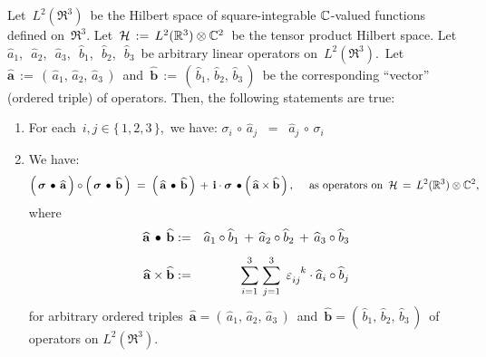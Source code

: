 \vskip 0.5cm
\begin{lemma}
\label{PauliMatricesSpinorProperties}
\mbox{}
\vskip 0.1cm
\noindent
Let
\,$L^{2}(\Re^{3})$\,
be the Hilbert space of square-integrable $\mathbb{C}$-valued functions defined on \,$\Re^{3}$.
\vskip 0.1cm
\noindent
Let
\,$\mathcal{H} \, := \, L^{2}(\mathbb{R}^{3}) \otimes \mathbb{C}^{2}$\,
be the tensor product Hilbert space.
\vskip 0.1cm
\noindent
Let
\,$\widehat{a}_{1}$,\,
\,$\widehat{a}_{2}$,\,
\,$\widehat{a}_{3}$,\,
\,$\widehat{b}_{1}$,\,
\,$\widehat{b}_{2}$,\,
\,$\widehat{b}_{3}$\,
be arbitrary {\color{red}linear} operators on \,$L^{2}(\Re^{3})$.\,
\vskip 0.1cm
\noindent
Let
\,$\widehat{\boldsymbol{a}} \, := \, \left(\,\widehat{a}_{1},\,\widehat{a}_{2},\,\widehat{a}_{3}\,\right)$\,
and
\,$\widehat{\boldsymbol{b}} \, := \, \left(\,\widehat{b}_{1},\,\widehat{b}_{2},\,\widehat{b}_{3}\,\right)$\,
be the corresponding ``vector'' (ordered triple) of operators.
\vskip 0.1cm
\noindent
Then, the following statements are true:
\begin{enumerate}
\item
    For each \,$i,j \in \{\,1,2,3\,\}$,\, we have:
    \;$
    \sigma_{i} \,\circ\, \widehat{a}_{j}
    \;\; = \;\;
        \widehat{a}_{j} \,\circ\, \sigma_{i}
    $\,
\item
    We have:
    \begin{equation*}
    \left(\,\boldsymbol{\sigma} \,\overset{{\color{white}1}}{\bullet}\, \widehat{\mathbf{a}}\,\right)
    \circ
    \left(\,\boldsymbol{\sigma} \,\bullet\, \widehat{\mathbf{b}}\,\right)
    \; = \;
        \left(\,\widehat{\mathbf{a}}\,\bullet\,\widehat{\mathbf{b}}\,\right)
        \, + \,
        \i\cdot\boldsymbol{\sigma} \,\bullet \left(\,\widehat{\mathbf{a}} \times \widehat{\mathbf{b}}\,\right),
    \quad
    \textnormal{
        as operators on
        \,$\mathcal{H} \,=\, L^{2}(\Re^{3})\overset{{\color{white}.}}{\otimes}\C^{2}$,\,
        }
    \end{equation*}
    where
    \begin{eqnarray*}
    \widehat{\mathbf{a}}\,\bullet\,\widehat{\mathbf{b}}
    & := &
        \widehat{a}_{1} \circ \widehat{b}_{1}
        \, + \,
        \widehat{a}_{2} \circ \widehat{b}_{2}
        \, + \,
        \widehat{a}_{3} \circ \widehat{b}_{3}
    \\
    \widehat{\mathbf{a}}\times\widehat{\mathbf{b}}
    & := &
        \overset{{\color{white}.}}{
        \overset{3}{\underset{i=1}{\sum}}\;
        \overset{3}{\underset{j=1}{\sum}}\;\,
        \varepsilon_{ij{\color{white}k}}^{{\color{white}ij}k}
        \cdot
        \widehat{a}_{i} \circ \widehat{b}_{j}
        }
    \end{eqnarray*}
    for arbitrary ordered triples
    \,$\widehat{\mathbf{a}} = \left(\,\widehat{a}_{1},\,\widehat{a}_{2},\,\widehat{a}_{3}\,\right)$\,
    and
    \,$\widehat{\mathbf{b}} = \left(\,\widehat{b}_{1},\,\widehat{b}_{2},\,\widehat{b}_{3}\,\right)$\,
    of operators on $L^{2}(\Re^{3})$.
\end{enumerate}
\end{lemma}
